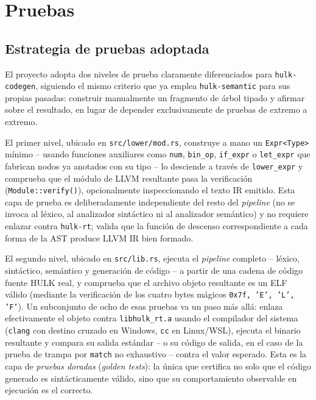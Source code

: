 \documentclass[12pt, a4paper]{article}
\begin{document}
\section{Pruebas} 
\label{sec:pruebas}

\subsection{Estrategia de pruebas adoptada}

El proyecto adopta dos niveles de prueba claramente diferenciados para
\texttt{hulk-codegen}, siguiendo el mismo criterio que ya emplea
\texttt{hulk-semantic} para sus propias pasadas: construir manualmente un
fragmento de árbol tipado y afirmar sobre el resultado, en lugar de depender
exclusivamente de pruebas de extremo a extremo.

El primer nivel, ubicado en \texttt{src/lower/mod.rs}, construye a mano un
\texttt{Expr<Type>} mínimo -- usando funciones auxiliares como \texttt{num},
\texttt{bin\_op}, \texttt{if\_expr} o \texttt{let\_expr} que fabrican nodos ya
anotados con su tipo -- lo desciende a través de \texttt{lower\_expr} y
comprueba que el módulo de LLVM resultante pasa la verificación
(\texttt{Module::verify()}), opcionalmente inspeccionando el texto IR emitido.
Esta capa de prueba es deliberadamente independiente del resto del
\textit{pipeline} (no se invoca al léxico, al analizador sintáctico ni al
analizador semántico) y no requiere enlazar contra \texttt{hulk-rt}; valida
que la función de descenso correspondiente a cada forma de la AST produce LLVM
IR bien formado.

El segundo nivel, ubicado en \texttt{src/lib.rs}, ejecuta el \textit{pipeline}
completo -- léxico, sintáctico, semántico y generación de código -- a partir
de una cadena de código fuente HULK real, y comprueba que el archivo objeto
resultante es un ELF válido (mediante la verificación de los cuatro bytes
mágicos \texttt{0x7f, 'E', 'L', 'F'}). Un subconjunto de ocho de esas pruebas
va un paso más allá: enlaza efectivamente el objeto contra
\texttt{libhulk\_rt.a} usando el compilador del sistema (\texttt{clang} con
destino cruzado en Windows, \texttt{cc} en Linux/WSL), ejecuta el binario
resultante y compara su salida estándar -- o su código de salida, en el caso
de la prueba de trampa por \texttt{match} no exhaustivo -- contra el valor
esperado. Esta es la capa de \textit{pruebas doradas} (\textit{golden tests}):
la única que certifica no solo que el código generado es sintácticamente
válido, sino que su comportamiento observable en ejecución es el correcto.
\end{document}
